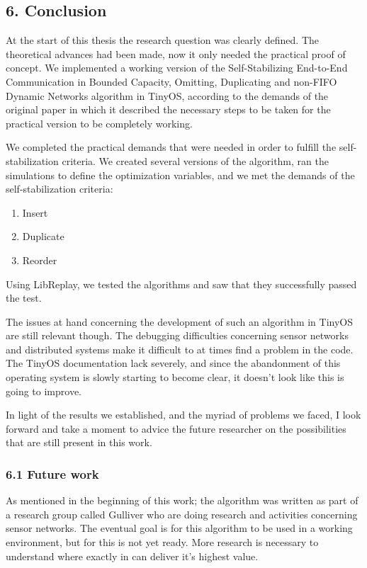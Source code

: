 \subsection{6. Conclusion}\label{conclusion}

At the start of this thesis the research question was clearly defined.
The theoretical advances had been made, now it only needed the practical
proof of concept. We implemented a working version of the
Self-Stabilizing End-to-End Communication in Bounded Capacity, Omitting,
Duplicating and non-FIFO Dynamic Networks algorithm in TinyOS, according
to the demands of the original paper in which it described the necessary
steps to be taken for the practical version to be completely working.

We completed the practical demands that were needed in order to fulfill
the self-stabilization criteria. We created several versions of the
algorithm, ran the simulations to define the optimization variables, and
we met the demands of the self-stabilization criteria:

\begin{enumerate}
\def\labelenumi{\arabic{enumi}.}
\itemsep1pt\parskip0pt
\item
  Insert
\item
  Duplicate
\item
  Reorder
\end{enumerate}

Using LibReplay, we tested the algorithms and saw that they successfully
passed the test.

The issues at hand concerning the development of such an algorithm in
TinyOS are still relevant though. The debugging difficulties concerning
sensor networks and distributed systems make it difficult to at times
find a problem in the code. The TinyOS documentation lack severely, and
since the abandonment of this operating system is slowly starting to
become clear, it doesn't look like this is going to improve.

In light of the results we established, and the myriad of problems we
faced, I look forward and take a moment to advice the future researcher
on the possibilities that are still present in this work.

\subsubsection{6.1 Future work}\label{future-work}

As mentioned in the beginning of this work; the algorithm was written as
part of a research group called Gulliver who are doing research and
activities concerning sensor networks. The eventual goal is for this
algorithm to be used in a working environment, but for this is not yet
ready. More research is necessary to understand where exactly in can
deliver it's highest value.

